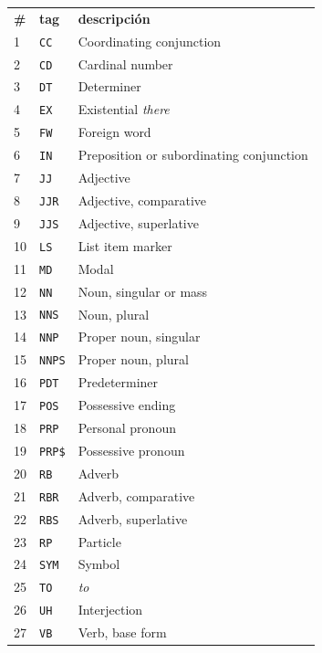\begin{table}[htbp]
\centering
\begin{subtable}[t]{0.60\linewidth}
\centering
\begin{tabular}{|l|l|l|}
\hline
\textbf{\#} & \textbf{tag} & \textbf{descripción} \\ \hhline{===}
1 & \verb=CC= & Coordinating conjunction \\ \hline
2 & \verb=CD= & Cardinal number \\ \hline
3 & \verb=DT= & Determiner \\ \hline
4 & \verb=EX= & Existential \emph{there} \\ \hline
5 & \verb=FW= & Foreign word \\ \hline
6 & \verb=IN= & Preposition or subordinating conjunction \\ \hline
7 & \verb=JJ= & Adjective \\ \hline
8 & \verb=JJR= & Adjective, comparative \\ \hline
9 & \verb=JJS= & Adjective, superlative \\ \hline
10 & \verb=LS= & List item marker \\ \hline
11 & \verb=MD= & Modal \\ \hline
12 & \verb=NN= & Noun, singular or mass \\ \hline
13 & \verb=NNS= & Noun, plural \\ \hline
14 & \verb=NNP= & Proper noun, singular \\ \hline
15 & \verb=NNPS= & Proper noun, plural \\ \hline
16 & \verb=PDT= & Predeterminer \\ \hline
17 & \verb=POS= & Possessive ending \\ \hline
18 & \verb=PRP= & Personal pronoun \\ \hline
19 & \verb=PRP$= & Possessive pronoun \\ \hline
20 & \verb=RB= & Adverb \\ \hline
21 & \verb=RBR= & Adverb, comparative \\ \hline
22 & \verb=RBS= & Adverb, superlative \\ \hline
23 & \verb=RP= & Particle \\ \hline
24 & \verb=SYM= & Symbol \\ \hline
25 & \verb=TO= & \emph{to} \\ \hline
26 & \verb=UH= & Interjection \\ \hline
27 & \verb=VB= & Verb, base form \\ \hline

\end{tabular}
\end{subtable}
\end{table}
